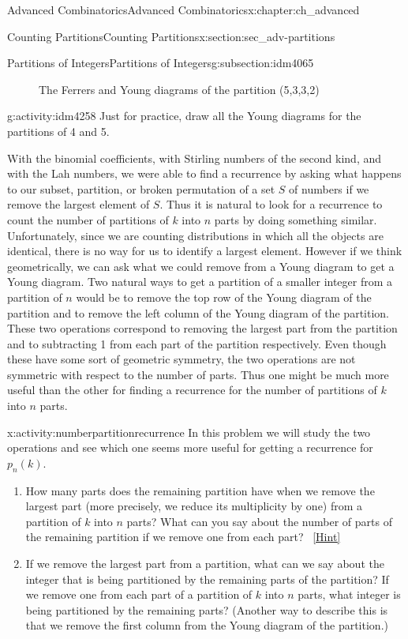 \documentclass[oneside,10pt,]{book}
\numberwithin{equation}{chapter}
\begin{document}
\begin{chapterptx}{Advanced Combinatorics}{}{Advanced Combinatorics}{}{}{x:chapter:ch_advanced}
\begin{sectionptx}{Counting Partitions}{}{Counting Partitions}{}{}{x:section:sec_adv-partitions}
\begin{subsectionptx}{Partitions of Integers}{}{Partitions of Integers}{}{}{g:subsection:idm4065}
\begin{figure}
\caption{The Ferrers and Young diagrams of the partition (5,3,3,2)\label{x:figure:FerrersYoung}}
\end{figure}
\begin{activity}{}{g:activity:idm4258}%
Just for practice, draw all the Young diagrams for the partitions of 4 and 5.%
\end{activity}
With the binomial coefficients, with Stirling numbers of the second kind, and with the Lah numbers, we were able to find a recurrence by asking what happens to our subset, partition, or broken permutation of a set \(S\) of numbers if we remove the largest element of \(S\). Thus it is natural to look for a recurrence to count the number of partitions of \(k\) into \(n\) parts by doing something similar. Unfortunately, since we are counting distributions in which all the objects are identical, there is no way for us to identify a largest element. However if we think geometrically, we can ask what we could remove from a Young diagram to get a Young diagram. Two natural ways to get a partition of a smaller integer from a partition of \(n\) would be to remove the top row of the Young diagram of the partition and to remove the left column of the Young diagram of the partition. These two operations correspond to removing the largest part from the partition and to subtracting 1 from each part of the partition respectively. Even though these have some sort of geometric symmetry, the two operations are not symmetric with respect to the number of parts. Thus one might be much more useful than the other for finding a recurrence for the number of partitions of \(k\) into \(n\) parts.%
\begin{activity}{}{x:activity:numberpartitionrecurrence}%
In this problem we will study the two operations and see which one seems more useful for getting a recurrence for \(p_n(k)\).%
\begin{enumerate}[font=\bfseries,label=(\alph*),ref=\alph*]
\item{}How many parts does the remaining partition have when we remove the largest part (more precisely, we reduce its multiplicity by one) from a partition of \(k\) into \(n\) parts?  What can you say about the number of parts of the remaining partition if we remove one from each part?%
\qquad~\hfill{\tiny\hyperlink{g:hint:idm4278-back}{[Hint]}}\item{}If we remove the largest part from a partition, what can we say about the integer that is being partitioned by the remaining parts of the partition? If we remove one from each part of a partition of \(k\) into \(n\) parts, what integer is being partitioned by the remaining parts? (Another way to describe this is that we remove the first column from the Young diagram of the partition.)%

\end{enumerate}
\end{activity}
\end{subsectionptx}
\end{sectionptx}
\end{chapterptx}
\end{document}
